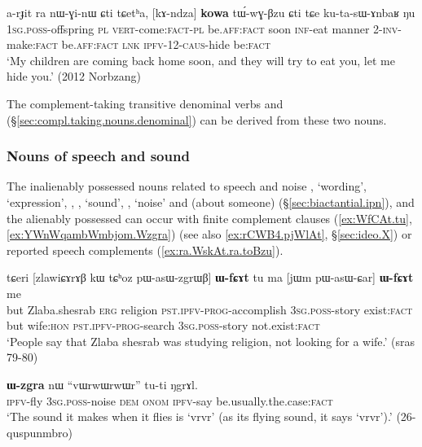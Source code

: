  \begin{exe}
\ex \label{ex:kAndza.kowa.tuwGBzu}
\gll  a-rɟit ra nɯ-ɣi-nɯ ɕti tɕetʰa, [kɤ-ndza] \textbf{kowa} tɯ́-wɣ-βzu ɕti tɕe ku-ta-sɯ-ɤnbaʁ ŋu \\
\textsc{1sg}.\textsc{poss}-offspring \textsc{pl} \textsc{vert}-come:\textsc{fact}-\textsc{pl} be.\textsc{aff}:\textsc{fact} soon \textsc{inf}-eat manner 2-\textsc{inv}-make:\textsc{fact} be.\textsc{aff}:\textsc{fact} \textsc{lnk} \textsc{ipfv}-1\fl{}2-\textsc{caus}-hide be:\textsc{fact} \\
\glt `My children are coming back home soon, and they will try to eat you, let me hide you.' (2012 Norbzang)
\end{exe}

The com\-ple\-ment-taking transitive denominal verbs  and  (§\ref{sec:compl.taking.nouns.denominal}) can be derived from these two nouns.
 
\subsubsection{Nouns of speech and sound} \label{sec:nouns.speech.complement}
The inalienably possessed nouns related to speech and noise , `wording', `expression', , , `sound', , `noise' and  (about someone) (§\ref{sec:biactantial.ipn}), and the alienably possessed  can occur with finite complement clauses (\ref{ex:WfCAt.tu}, \ref{ex:YWnWqambWmbjom.Wzgra}) (see also \ref{ex:rCWB4.pjWlAt}, §\ref{sec:ideo.X}) or reported speech complements (\ref{ex:ra.WskAt.ra.toBzu}).

\begin{exe}
   \ex  \label{ex:WfCAt.tu}
\gll  tɕeri [zlawiɕɤrɤβ kɯ tɕʰoz pɯ-asɯ-zgrɯβ] \textbf{ɯ-fɕɤt} tu ma [jɯm pɯ-asɯ-ɕar] \textbf{ɯ-fɕɤt} me \\
 but Zlaba.shesrab \textsc{erg} religion \textsc{pst}.\textsc{ipfv}-\textsc{prog}-accomplish  \textsc{3sg}.\textsc{poss}-story
exist:\textsc{fact} but wife:\textsc{hon} \textsc{pst}.\textsc{ipfv}-\textsc{prog}-search  \textsc{3sg}.\textsc{poss}-story not.exist:\textsc{fact} \\
\glt `People say that Zlaba shesrab was studying religion, not looking for a wife.'  (sras 79-80)
\end{exe}

\begin{exe}
   \ex  \label{ex:YWnWqambWmbjom.Wzgra}
\gll [ɲɯ-nɯqambɯmbjom] \textbf{ɯ-zgra} nɯ ``vɯrwɯrwɯr'' tu-ti ŋgrɤl. \\
\textsc{ipfv}-fly \textsc{3sg}.\textsc{poss}-noise \textsc{dem} \textsc{onom} \textsc{ipfv}-say be.usually.the.case:\textsc{fact} \\
\glt `The sound it makes when it flies is `vrvr' (as its flying sound, it says `vrvr').' (26-quspunmbro)
\end{exe}
 

